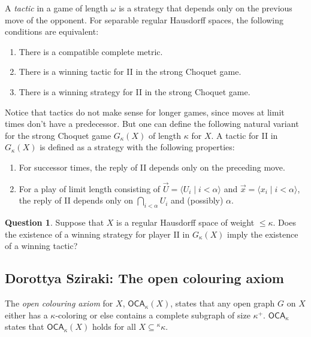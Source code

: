 \documentclass{amsart}
\theoremstyle{definition}
\newtheorem{question}[theorem]{Question}
\begin{document}
A \emph{tactic} in a game of length $\omega$ is a strategy that depends only on the previous move of the opponent. 
For separable regular Hausdorff spaces, the following conditions are equivalent: 

\begin{enumerate} 
\item 
There is a compatible complete metric. 
\item 
There is a winning tactic for II in the strong Choquet game. 
\item 
There is a winning strategy for II in the strong Choquet game. 
\end{enumerate} 

Notice that tactics do not make sense for longer games, since moves at limit times don't have a predecessor. 
But one can define the following natural variant for 
the strong Choquet game $G_\kappa(X)$ of length $\kappa$ for $X$. 
A tactic for II in $G_\kappa(X)$ is defined as a strategy with the following properties: 

\begin{enumerate} 
\item 
For successor times, the reply of II depends only on the preceding move. 
\item 
For a play of limit length consisting of $\vec{U}=\langle U_i\mid i<\alpha\rangle$ and $\vec{x}=\langle x_i\mid i<\alpha\rangle$, the reply of II depends only on $\bigcap_{i<\alpha} U_i$ and (possibly) $\alpha$. 
\end{enumerate} 

\begin{question} 
Suppose that $X$ is a regular Hausdorff space of weight $\leq\kappa$. 
Does the existence of a winning strategy for player II in $G_\kappa(X)$ imply the existence of a winning tactic? 
\end{question} 



\subsection{Dorottya Sziraki: The open colouring axiom}

\newcommand{\OCA}{\mathsf{OCA}}
\newcommand{\OGD}{\mathsf{OGD}}
\newcommand{\PSP}{\mathsf{PSP}}

The \emph{open colouring axiom} for $X$, $\OCA_\kappa(X)$, states that any open graph $G$ on $X$ either has a $\kappa$-coloring or else contains a complete subgraph of size $\kappa^+$. 
$\OCA_\kappa$ states that $\OCA_\kappa(X)$ holds for all $X\subseteq {}^\kappa\kappa$. 
\end{document}
